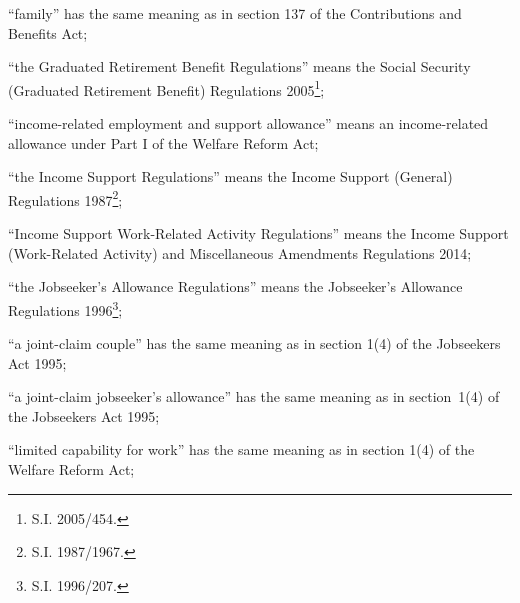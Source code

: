 \documentclass[12pt,a4paper]{article}
\begin{document}
\begin{enumerate}
“family” has the same meaning as in section 137 of the Contributions and Benefits Act;


“the Graduated Retirement Benefit Regulations” means the Social Security (Graduated Retirement Benefit) Regulations 2005\footnote{S.I. 2005/454.};

“income-related employment and support allowance” means an income-related allowance under Part I of the Welfare Reform Act;

“the Income Support Regulations” means the Income Support (General) Regulations 1987\footnote{\frenchspacing S.I. 1987/1967.};

“Income Support Work-Related Activity Regulations” means the Income Support (Work-Related Activity) and Miscellaneous Amendments Regulations 2014;

“the Jobseeker’s Allowance Regulations” means the Jobseeker’s Allowance Regulations 1996\footnote{\frenchspacing S.I. 1996/207.};

“a joint-claim couple” has the same meaning as in section 1(4) of the Jobseekers Act 1995;

    “a joint-claim jobseeker’s allowance” has the same meaning as in section~1(4) of the Jobseekers Act 1995;


“limited capability for work” has the same meaning as in section 1(4) of the Welfare Reform Act;



\end{enumerate}
\end{document}
